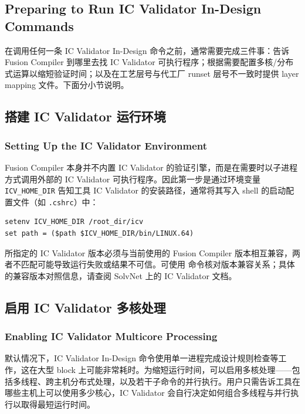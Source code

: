 \subsection*{Preparing to Run IC Validator In-Design Commands}

在调用任何一条 IC Validator In-Design 命令之前，通常需要完成三件事：告诉 Fusion Compiler 到哪里去找 IC Validator 可执行程序；根据需要配置多核/分布式运算以缩短验证时间；以及在工艺层号与代工厂 runset 层号不一致时提供 layer mapping 文件。下面分小节说明。

\subsection{搭建 IC Validator 运行环境}
\subsubsection*{Setting Up the IC Validator Environment}

Fusion Compiler 本身并不内置 IC Validator 的验证引擎，而是在需要时以子进程方式调用外部的 IC Validator 可执行程序。因此第一步是通过环境变量 \texttt{ICV\_HOME\_DIR} 告知工具 IC Validator 的安装路径，通常将其写入 shell 的启动配置文件（如 \texttt{.cshrc}）中：

\begin{lstlisting}
setenv ICV_HOME_DIR /root_dir/icv
set path = ($path $ICV_HOME_DIR/bin/LINUX.64)
\end{lstlisting}

\begin{noteBox}
所指定的 IC Validator 版本必须与当前使用的 Fusion Compiler 版本相互兼容，两者不匹配可能导致运行失败或结果不可信。可使用  命令核对版本兼容关系；具体的兼容版本对照信息，请查阅 SolvNet 上的 IC Validator 文档。
\end{noteBox}

\subsection{启用 IC Validator 多核处理}
\subsubsection*{Enabling IC Validator Multicore Processing}

默认情况下，IC Validator In-Design 命令使用单一进程完成设计规则检查等工作，这在大型 block 上可能非常耗时。为缩短运行时间，可以启用多核处理——包括多线程、跨主机分布式处理，以及若干子命令的并行执行。用户只需告诉工具在哪些主机上可以使用多少核心，IC Validator 会自行决定如何组合多线程与并行执行以取得最短运行时间。

